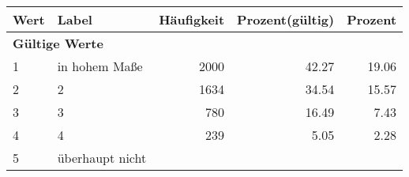      \begin{longtable}{lXrrr}
     \toprule
     \textbf{Wert} & \textbf{Label} & \textbf{Häufigkeit} & \textbf{Prozent(gültig)} & \textbf{Prozent} \\
     \endhead
     \midrule
     \multicolumn{5}{l}{\textbf{Gültige Werte}}\\

     1 &
     \multicolumn{1}{X}{ in hohem Maße   } &


       \num{2000} &
       \num[round-mode=places,round-precision=2]{42,27} &
         \num[round-mode=places,round-precision=2]{19,06} \\

     2 &
     \multicolumn{1}{X}{ 2   } &


       \num{1634} &
       \num[round-mode=places,round-precision=2]{34,54} &
         \num[round-mode=places,round-precision=2]{15,57} \\

     3 &
     \multicolumn{1}{X}{ 3   } &


       \num{780} &
       \num[round-mode=places,round-precision=2]{16,49} &
         \num[round-mode=places,round-precision=2]{7,43} \\

     4 &
     \multicolumn{1}{X}{ 4   } &


       \num{239} &
       \num[round-mode=places,round-precision=2]{5,05} &
         \num[round-mode=places,round-precision=2]{2,28} \\

     5 &
     \multicolumn{1}{X}{ überhaupt nicht   } &



\end{longtable}
